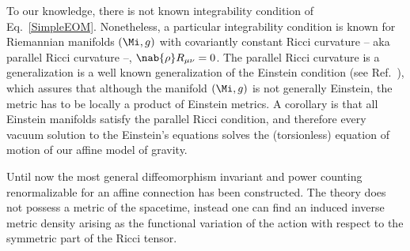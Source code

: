 \documentclass[aps,prl,twocolumn,superscriptaddress,showpacs,showkeys]{revtex4-1}
\begin{document}
To our knowledge, there is not known integrability condition of Eq.~\eqref{SimpleEOM}. Nonetheless, a particular integrability condition is known for Riemannian manifolds $(\Mi,g)$ with covariantly constant Ricci curvature -- aka {parallel Ricci curvature} --, $\nab{\rho} R_{\mu\nu} = 0$. The parallel Ricci curvature is a generalization is a well known generalization of the Einstein condition (see Ref.~\cite{Besse}), which assures that although the manifold $(\Mi,g)$ is not generally Einstein, the metric has to be locally a product of Einstein metrics. A corollary is that all Einstein manifolds satisfy the parallel Ricci condition, and therefore every vacuum solution to the Einstein's equations solves the (torsionless) equation of motion of our affine model of gravity.






Until now the most general diffeomorphism invariant and power counting renormalizable for an affine connection has been constructed. The theory does not possess a metric of the spacetime, instead one can find an induced inverse metric density arising as the functional variation of the action with respect to the symmetric part of the Ricci tensor.

\end{document}
